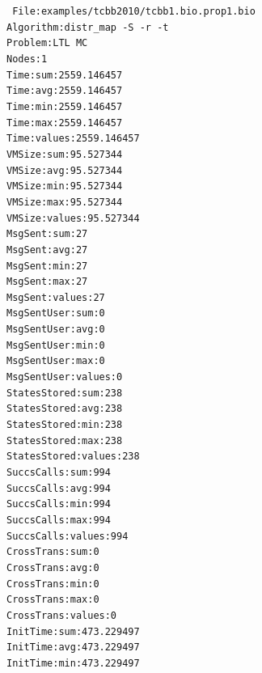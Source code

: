 \documentclass[11pt,final,oneside]{fithesis}
\begin{document}
{\tt\noindent
File:examples/tcbb2010/tcbb1.bio.prop1.bio\\
Algorithm:distr\_map -S -r -t\\
Problem:LTL MC\\
Nodes:1\\
Time:sum:2559.146457\\
Time:avg:2559.146457\\
Time:min:2559.146457\\
Time:max:2559.146457\\
Time:values:2559.146457\\
VMSize:sum:95.527344\\
VMSize:avg:95.527344\\
VMSize:min:95.527344\\
VMSize:max:95.527344\\
VMSize:values:95.527344\\
MsgSent:sum:27\\
MsgSent:avg:27\\
MsgSent:min:27\\
MsgSent:max:27\\
MsgSent:values:27\\
MsgSentUser:sum:0\\
MsgSentUser:avg:0\\
MsgSentUser:min:0\\
MsgSentUser:max:0\\
MsgSentUser:values:0\\
StatesStored:sum:238\\
StatesStored:avg:238\\
StatesStored:min:238\\
StatesStored:max:238\\
StatesStored:values:238\\
SuccsCalls:sum:994\\
SuccsCalls:avg:994\\
SuccsCalls:min:994\\
SuccsCalls:max:994\\
SuccsCalls:values:994\\
CrossTrans:sum:0\\
CrossTrans:avg:0\\
CrossTrans:min:0\\
CrossTrans:max:0\\
CrossTrans:values:0\\
InitTime:sum:473.229497\\
InitTime:avg:473.229497\\
InitTime:min:473.229497\\
}
\end{document}
